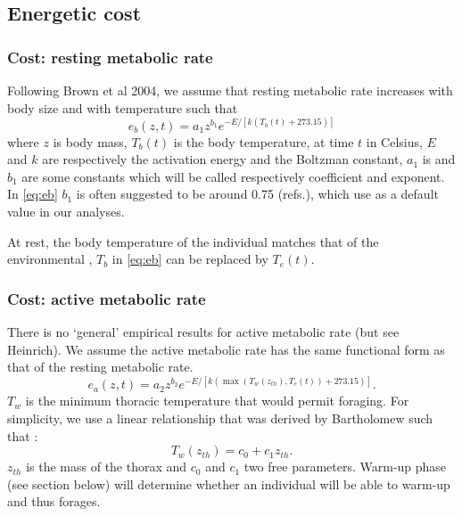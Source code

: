 \subsection*{Energetic cost}
\subsubsection*{Cost: resting metabolic rate}
Following Brown et al 2004, we assume that resting metabolic rate increases with body size and with temperature such that
\begin{equation} \label{eq:eb}
	e_b(z, t) = a_1 z^{b_1} e^{-E/[k (T_b(t)+ 273.15)]}
\end{equation}
where $z$ is body mass, $T_b(t)$ is the body temperature, at time $t$ in Celsius, $E$ and $k$ are respectively the activation energy and the Boltzman constant, $a_1$ is and $b_1$ are some constants which will be called respectively coefficient and exponent.
In \cref{eq:eb} $b_1$ is often suggested to be around 0.75 (refs.), which use as a default value in our analyses.

At rest, the body temperature of the individual matches that of the environmental \citep[e.g.,]{Bartholomew1978}, $T_b$ in \cref{eq:eb} can be replaced by $T_e(t)$.

\subsubsection*{Cost: active metabolic rate}
There is no `general' empirical results for active metabolic rate (but see Heinrich).
We assume the active metabolic rate has the same functional form as that of the resting metabolic rate.
\begin{equation} \label{eq:ea}
	e_a(z,t) = a_2 z^{b_2}  e^{-E/[k (\max(T_w(z_{th}), T_e(t))+ 273.15)]}.
\end{equation}
$T_w$ is the minimum thoracic temperature that would permit foraging.
For simplicity, we use a linear relationship that was derived by Bartholomew such that :
\begin{equation} \label{eq:Tw}
	T_w(z_{th}) = c_0+ c_1 z_{th}.
\end{equation}
$z_{th}$ is the mass of the thorax and $c_0$ and $c_1$ two free parameters.
Warm-up phase (see section below) will determine whether an individual will be able to warm-up and thus forages.

